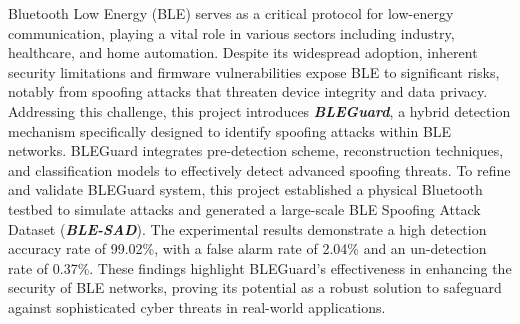 
\setmainfont{Times New Roman} \xiaosihao 
\setlength{\baselineskip}{20pt} 

\noindent Bluetooth Low Energy (BLE) serves as a critical protocol for low-energy communication, playing a vital role in various sectors including industry, healthcare, and home automation. Despite its widespread adoption, inherent security limitations and firmware vulnerabilities expose BLE to significant risks, notably from spoofing attacks that threaten device integrity and data privacy. Addressing this challenge, this project introduces \textit{\textbf{BLEGuard}}, a hybrid detection mechanism specifically designed to identify spoofing attacks within BLE networks. BLEGuard integrates pre-detection scheme, reconstruction techniques, and classification models to effectively detect advanced spoofing threats. To refine and validate BLEGuard system, this project established a physical Bluetooth testbed to simulate attacks and generated a large-scale BLE Spoofing Attack Dataset (\textit{\textbf{BLE-SAD}}). The experimental results demonstrate a high detection accuracy rate of 99.02\%, with a false alarm rate of 2.04\% and an un-detection rate of 0.37\%. These findings highlight BLEGuard's effectiveness in enhancing the security of BLE networks, proving its potential as a robust solution to safeguard against sophisticated cyber threats in real-world applications. \\





